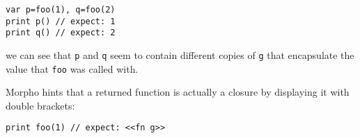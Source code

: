 \begin{lstlisting}
var p=foo(1), q=foo(2) 
print p() // expect: 1 
print q() // expect: 2
\end{lstlisting}

we can see that \texttt{p} and \texttt{q} seem to contain different
copies of \texttt{g} that encapsulate the value that \texttt{foo} was
called with.

Morpho hints that a returned function is actually a closure by
displaying it with double brackets:

\begin{lstlisting}
print foo(1) // expect: <<fn g>> 
\end{lstlisting}
